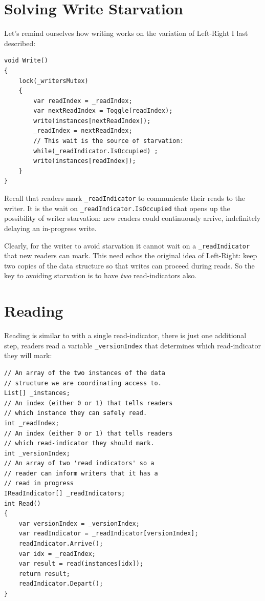 \documentclass[11pt]{article}
\begin{document}
\section{Solving Write Starvation}

Let's remind ourselves how writing works on the variation of Left-Right I last described:

\begin{lstlisting}
void Write()
{
    lock(_writersMutex)
    {
        var readIndex = _readIndex;
        var nextReadIndex = Toggle(readIndex);
        write(instances[nextReadIndex]);
        _readIndex = nextReadIndex;
        // This wait is the source of starvation:
        while(_readIndicator.IsOccupied) ;
        write(instances[readIndex]);
    }
}
\end{lstlisting}

Recall that readers mark \texttt{\_readIndicator} to communicate their reads to the writer. It is the wait on \texttt{\_readIndicator.IsOccupied} that opens up the possibility of writer starvation: new readers could continuously arrive, indefinitely delaying an in-progress write. 

Clearly, for the writer to avoid starvation it cannot wait on a \texttt{\_readIndicator} that new readers can mark. This need echos the original idea of Left-Right: keep two copies of the data structure so that writes can proceed during reads. So the key to avoiding starvation is to have \emph{two} read-indicators also.

\section{Reading}

Reading is similar to with a single read-indicator, there is just one additional step, readers read a variable \texttt{\_versionIndex} that determines which read-indicator they will mark:

\begin{lstlisting}
// An array of the two instances of the data 
// structure we are coordinating access to.
List[] _instances;
// An index (either 0 or 1) that tells readers 
// which instance they can safely read.
int _readIndex; 
// An index (either 0 or 1) that tells readers 
// which read-indicator they should mark.
int _versionIndex; 
// An array of two 'read indicators' so a 
// reader can inform writers that it has a 
// read in progress
IReadIndicator[] _readIndicators; 
int Read()
{
    var versionIndex = _versionIndex;
    var readIndicator = _readIndicator[versionIndex];
    readIndicator.Arrive();
    var idx = _readIndex;
    var result = read(instances[idx]);
    return result;
    readIndicator.Depart();
}
\end{lstlisting}
\end{document}
